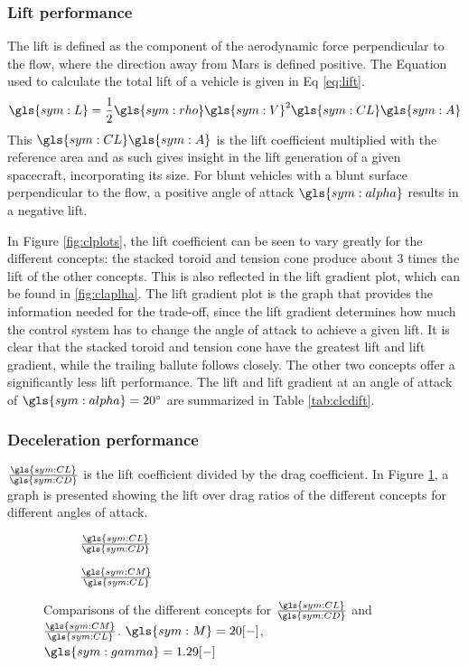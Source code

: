 \subsubsection{Lift performance}
The lift is defined as the component of the aerodynamic force perpendicular to the flow, where the direction away from Mars is defined positive. The Equation used to calculate the total lift of a vehicle is given in Eq \ref{eq:lift}.
\begin{equation}
\gls{sym:L} = \frac{1}{2}\gls{sym:rho}\gls{sym:V}^2\gls{sym:CL}\gls{sym:A}
\label{eq:lift}
\end{equation}
This $\gls{sym:CL}\gls{sym:A}$ is the lift coefficient multiplied with the reference area and as such gives insight in the lift generation of a given spacecraft, incorporating its size. For blunt vehicles with a blunt surface perpendicular to the flow, a positive angle of attack $\gls{sym:alpha}$ results in a negative lift.

In Figure \ref{fig:clplots}, the lift coefficient can be seen to vary greatly for the different concepts: the stacked toroid and tension cone produce about 3 times the lift of the other concepts. This is also reflected in the lift gradient plot, which can be found in \ref{fig:claplha}. The lift gradient plot is the graph that provides the information needed for the trade-off, since the lift gradient determines how much the control system has to change the angle of attack to achieve a given lift. It is clear that the stacked toroid and tension cone have the greatest lift and lift gradient, while the trailing ballute follows closely. The other two concepts offer a significantly less lift performance. The lift and lift gradient at an angle of attack of $\gls{sym:alpha}=20^\circ$ are summarized in Table \ref{tab:clcdift}.



\subsubsection{Deceleration performance}
$\frac{\gls{sym:CL}}{\gls{sym:CD}}$ is the lift coefficient divided by the drag coefficient. In Figure \ref{fig:clcd}, a graph is presented showing the lift over drag ratios of the different concepts for different angles of attack.


\begin{figure}[h]
	\centering
	\begin{subfigure}{0.49\textwidth}
		\setlength{} 
		\setlength{}
		
		\caption{$\frac{\gls{sym:CL}}{\gls{sym:CD}}$}
		\label{fig:clcd}
	\end{subfigure}
	\begin{subfigure}{0.49\textwidth}
		\setlength{} 
		\setlength{}
			
		\caption{$\frac{\gls{sym:CM}}{\gls{sym:CL}}$}
		\label{fig:cmcl}
	\end{subfigure}
	\caption{Comparisons of the different concepts for $\frac{\gls{sym:CL}}{\gls{sym:CD}}$ and $\frac{\gls{sym:CM}}{\gls{sym:CL}}$. $\gls{sym:M}=20[-]$, $\gls{sym:gamma}=1.29[-]$}
	\label{fig:cmcl-clcd}
\end{figure}

